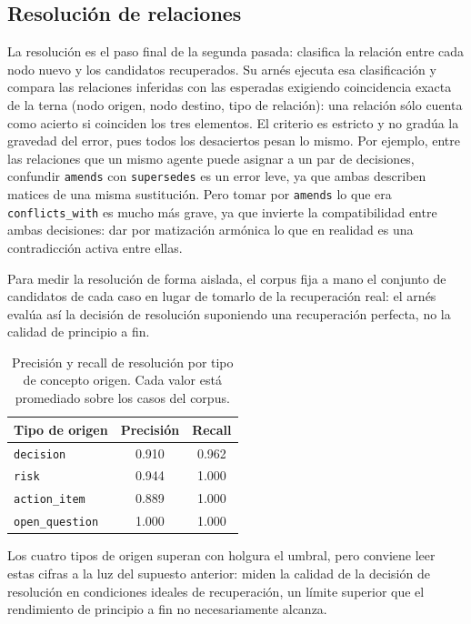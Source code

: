 \subsection{Resolución de relaciones}

La resolución es el paso final de la segunda pasada: clasifica la relación entre cada nodo nuevo y
los candidatos recuperados. Su arnés ejecuta esa clasificación y compara las relaciones inferidas
con las esperadas exigiendo coincidencia exacta de la terna (nodo origen, nodo destino, tipo de
relación): una relación sólo cuenta como acierto si coinciden los tres elementos. El criterio es
estricto y no gradúa la gravedad del error, pues todos los desaciertos pesan lo mismo. Por ejemplo,
entre las relaciones que un mismo agente puede asignar a un par de decisiones, confundir
\texttt{amends} con \texttt{supersedes} es un error leve, ya que ambas describen matices de una
misma sustitución. Pero tomar por \texttt{amends} lo que era \texttt{conflicts\_with} es mucho más
grave, ya que invierte la compatibilidad entre ambas decisiones: dar por matización armónica lo que
en realidad es una contradicción activa entre ellas.

Para medir la resolución de forma aislada, el corpus fija a mano el conjunto de candidatos
de cada caso en lugar de tomarlo de la recuperación real: el arnés evalúa así la decisión de
resolución suponiendo una recuperación perfecta, no la calidad de principio a fin.

\begin{table}[H]
  \centering
  \begin{tabular}{lcc}
    \toprule
    \textbf{Tipo de origen} & \textbf{Precisión} & \textbf{Recall} \\
    \midrule
    \texttt{decision}       & 0.910 & 0.962 \\
    \texttt{risk}           & 0.944 & 1.000 \\
    \texttt{action\_item}   & 0.889 & 1.000 \\
    \texttt{open\_question} & 1.000 & 1.000 \\
    \bottomrule
  \end{tabular}
  \caption{Precisión y recall de resolución por tipo de concepto origen. Cada valor está
           promediado sobre los casos del corpus.}
  \label{tab:eval-resolution}
\end{table}

Los cuatro tipos de origen superan con holgura el umbral, pero conviene leer estas cifras a la luz
del supuesto anterior: miden la calidad de la decisión de resolución en condiciones ideales de
recuperación, un límite superior que el rendimiento de principio a fin no necesariamente alcanza.

